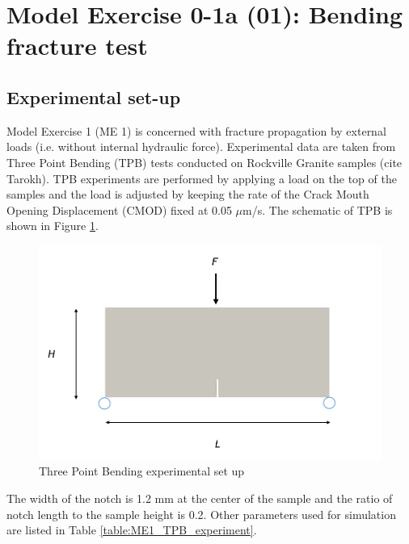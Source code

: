 \section{Model Exercise 0-1a (01): Bending fracture test}
\label{sec:mex01}
\subsection{Experimental set-up}
Model Exercise 1 (ME 1) is concerned with fracture propagation by external loads (i.e. without internal hydraulic force). Experimental data are taken from Three Point Bending (TPB) tests conducted on Rockville Granite samples (cite Tarokh). TPB experiments are performed by applying a load on the top of the samples and the load is adjusted by keeping the rate of the Crack Mouth Opening Displacement (CMOD) fixed at 0.05 $\mu$m/s.
The schematic of TPB is shown in Figure \ref{fig:ME1_TPB_experiment}.
\begin{figure}[!ht]
\centering
\includegraphics[width=1\textwidth]{figures/TPB_exp.png}
\caption{Three Point Bending experimental set up}
\label{fig:ME1_TPB_experiment}
\end{figure}

The width of the notch is 1.2 mm at the center of the sample and the ratio of notch length to the sample height is 0.2. 
Other parameters used for simulation are listed in Table \ref{table:ME1_TPB_experiment}.

